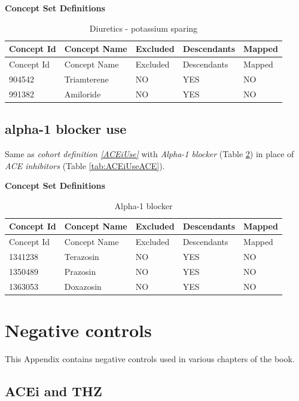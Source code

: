 \documentclass[11pt]{book}
\theoremstyle{definition}
\theoremstyle{definition}
\theoremstyle{definition}
\theoremstyle{remark}
\begin{document}
\textbf{Concept Set Definitions}

\begin{longtable}[]{@{}lllll@{}}
\caption{\label{tab:DPUseDPs} Diuretics - potassium sparing}\tabularnewline
\toprule
Concept Id & Concept Name & Excluded & Descendants & Mapped\tabularnewline
\midrule
\endfirsthead
\toprule
Concept Id & Concept Name & Excluded & Descendants & Mapped\tabularnewline
\midrule
\endhead
904542 & Triamterene & NO & YES & NO\tabularnewline
991382 & Amiloride & NO & YES & NO\tabularnewline
\bottomrule
\end{longtable}

\hypertarget{A1BUse}{%
\section{alpha-1 blocker use}\label{A1BUse}}

Same as \emph{cohort definition \ref{ACEiUse}} with \emph{Alpha-1 blocker} (Table \ref{tab:A1BUseA1Bs}) in place of \emph{ACE inhibitors} (Table \ref{tab:ACEiUseACE}).

\textbf{Concept Set Definitions}

\begin{longtable}[]{@{}lllll@{}}
\caption{\label{tab:A1BUseA1Bs} Alpha-1 blocker}\tabularnewline
\toprule
Concept Id & Concept Name & Excluded & Descendants & Mapped\tabularnewline
\midrule
\endfirsthead
\toprule
Concept Id & Concept Name & Excluded & Descendants & Mapped\tabularnewline
\midrule
\endhead
1341238 & Terazosin & NO & YES & NO\tabularnewline
1350489 & Prazosin & NO & YES & NO\tabularnewline
1363053 & Doxazosin & NO & YES & NO\tabularnewline
\bottomrule
\end{longtable}

\hypertarget{NegativeControlsAppendix}{%
\chapter{Negative controls}\label{NegativeControlsAppendix}}

This Appendix contains negative controls used in various chapters of the book.

\hypertarget{AceiThzNsc}{%
\section{ACEi and THZ}\label{AceiThzNsc}}
\end{document}
